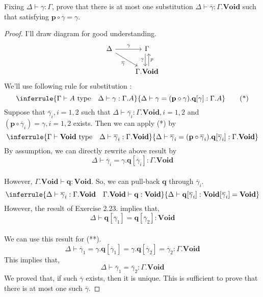 \documentclass[12pt, a4paper, openany, twoside]{book}
\theoremstyle{definition}
\theoremstyle{remark}
\theoremstyle{plain}
\numberwithin{equation}{section}
\begin{document}
\begin{tcolorbox}[breakable, colback=yellow!10!white,colframe=brown!75!black,title=Exercise 3.2.6.]\hypertarget{const 3.2.6.}{}
Fixing $\Delta \vdash \gamma : \Gamma$, prove that there is at most one substitution $\Delta \vdash \overline{\gamma} : \Gamma.\mathbf{Void}$ such that satisfying $\mathbf{p} \circ \overline{\gamma} = \gamma$. 
\begin{proof}
I'll draw diagram for good understanding. 
\[
\begin{tikzcd}
    \Delta \arrow[r, "\gamma"] \arrow[rd, "\overline{\gamma}"']& \Gamma \arrow[d, "?"', shift right]
    \\ & \Gamma.\mathbf{Void} \arrow[u, "p"', shift right]
\end{tikzcd}
\]
We'll use following rule for substitution : 
\[
\inferrule
{
    \Gamma \vdash A \text{ type} \quad \Delta \vdash \gamma : \Gamma.A 
}
{
    \Delta \vdash \gamma = (\mathbf{p} \circ \gamma).\mathbf{q}[\gamma] : \Gamma.A
}
\tag{*}
\]
Suppose that $\overline{\gamma}_i, i = 1, 2$ such that $\Delta \vdash \overline{\gamma_i} : \Gamma.\mathbf{Void}, i = 1,2$ and $(\mathbf{p} \circ \overline{\gamma}_i) = \gamma, i = 1, 2$ exists. 
Then we can apply (*) by 
\[
\inferrule
{
    \Gamma \vdash \mathbf{Void} \text{ type} \quad \Delta \vdash \overline{\gamma}_i : \Gamma.\mathbf{Void}
}
{
    \Delta \vdash \overline{\gamma}_i = (\mathbf{p} \circ \overline{\gamma}_i).\mathbf{q}[\overline{\gamma}_i] : \Gamma.\mathbf{Void}
}
\]
By assumption, we can directly rewrite above result by 
\[\Delta \vdash \overline{\gamma}_i = \gamma.\mathbf{q}[\overline{\gamma}_i] : \Gamma.\mathbf{Void}\tag{**}\]
\\
However, $\Gamma.\mathbf{Void} \vdash \mathbf{q} : \mathbf{Void}$. So, we can pull-back $\mathbf{q}$ through $\overline{\gamma}_i$. 
\[
\inferrule
{
    \Delta \vdash \overline{\gamma}_i : \Gamma.\mathbf{Void} \quad \Gamma.\mathbf{Void} \vdash \mathbf{q} : \mathbf{Void}
}
{
    \Delta \vdash \mathbf{q}[\overline{\gamma}_i] : \mathbf{Void}[\overline{\gamma}_i] = \mathbf{Void}
}
\]
However, the result of Exercise 2.23. implies that, 
\[\Delta \vdash \mathbf{q}[\overline{\gamma}_1] = \mathbf{q}[\overline{\gamma}_2] : \mathbf{Void}\]
\\
We can use this result for (**). 
\[\Delta \vdash \overline{\gamma}_1 = \gamma.\mathbf{q}[\overline{\gamma}_1] = \gamma.\mathbf{q}[\overline{\gamma}_2] = \overline{\gamma}_2 : \Gamma.\mathbf{Void}\]
This implies that, 
\[\Delta \vdash \overline{\gamma}_1 = \overline{\gamma}_2 : \Gamma.\mathbf{Void}\]
We proved that, if such $\overline{\gamma}$ exists, then it is unique. This is sufficient to prove that 
there is at most one such $\overline{\gamma}$. 

\end{proof}
\end{tcolorbox}
\end{document}
